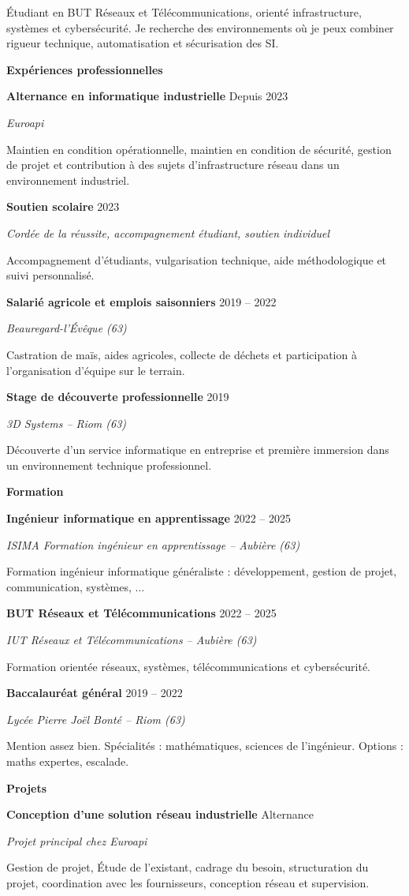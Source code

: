 \documentclass[10pt,a4paper]{article}
\newcommand{\sectiontitle}[1]{%
  \vspace{0.68em}%
  \noindent{\color{PortfolioBorder}\rule{\linewidth}{0.8pt}}\par
  \vspace{0.95em}%
  {\headingfont\fontsize{13.5}{13.5}\selectfont\bfseries\color{PortfolioAccent} #1}\par
  \vspace{0.32em}%
}
\newcommand{\cventry}[4]{%
  {\fontsize{10.2}{10.8}\selectfont\bfseries\color{PortfolioSoft} #1}\hfill{\fontsize{9.5}{10}\selectfont\color{PortfolioAccent} #2}\par
  {\fontsize{9.4}{10.2}\selectfont\itshape\color{PortfolioText} #3}\par
  {\fontsize{9.15}{10.8}\selectfont\color{PortfolioMuted} #4}\par
  \vspace{0.58em}
}
\begin{document}
\begin{minipage}[t]{0.64\textwidth}
  \vspace{0pt}
  {\fontsize{11.6}{14.2}\selectfont\color{PortfolioSoft}
  \'Etudiant en BUT Réseaux et Télécommunications, orienté infrastructure, syst\`emes et cybersécurité. Je recherche des environnements o\`u je peux combiner rigueur technique, automatisation et sécurisation des SI.}

  \vspace{0.45em}

  \sectiontitle{Expériences professionnelles}
  \cventry
    {Alternance en informatique industrielle}
    {Depuis 2023}
    {Euroapi}
    {Maintien en condition opérationnelle, maintien en condition de sécurité, gestion de projet et contribution \`a des sujets d'infrastructure réseau dans un environnement industriel.}

  \cventry
    {Soutien scolaire}
    {2023}
    {Cordée de la réussite, accompagnement étudiant, soutien individuel}
    {Accompagnement d'étudiants, vulgarisation technique, aide méthodologique et suivi personnalisé.}

  \cventry
    {Salarié agricole et emplois saisonniers}
    {2019 -- 2022}
    {Beauregard-l'\'Ev\^eque (63)}
    {Castration de ma\"is, aides agricoles, collecte de déchets et participation \`a l'organisation d'équipe sur le terrain.}

  \cventry
    {Stage de découverte professionnelle}
    {2019}
    {3D Systems -- Riom (63)}
    {Découverte d'un service informatique en entreprise et premi\`ere immersion dans un environnement technique professionnel.}

  \sectiontitle{Formation}
  \cventry
    {Ingénieur informatique en apprentissage}
    {2022 -- 2025}
    {ISIMA Formation ingénieur en apprentissage -- Aubière (63)}
    {Formation ingénieur informatique généraliste : développement, gestion de projet, communication, systèmes, ...}


  \cventry
    {BUT Réseaux et Télécommunications}
    {2022 -- 2025}
    {IUT Réseaux et Télécommunications -- Aubi\`ere (63)}
    {Formation orientée réseaux, syst\`emes, télécommunications et cybersécurité.}

  \cventry
    {Baccalauréat général}
    {2019 -- 2022}
    {Lycée Pierre Jo\"el Bonté -- Riom (63)}
    {Mention assez bien. Spécialités : mathématiques, sciences de l'ingénieur. Options : maths expertes, escalade.}

  \sectiontitle{Projets}
  \cventry
    {Conception d'une solution réseau industrielle}
    {Alternance}
    {Projet principal chez Euroapi}
    {Gestion de projet, \'Etude de l'existant, cadrage du besoin, structuration du projet, coordination avec les fournisseurs, conception réseau et supervision.}


\end{minipage}
\end{document}
